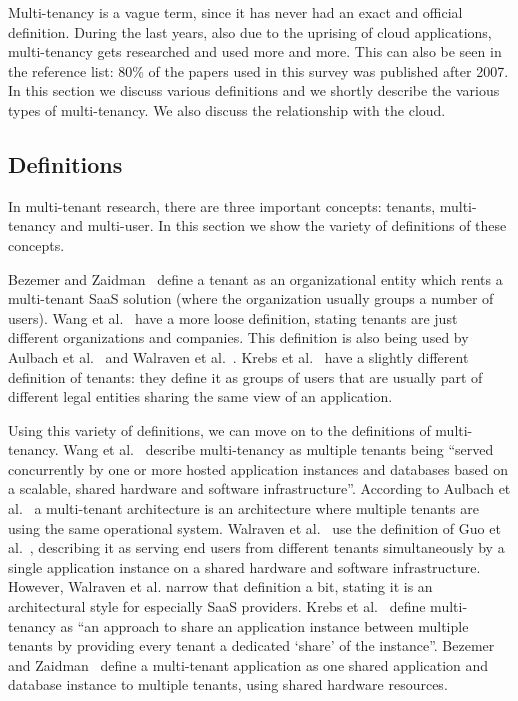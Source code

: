 Multi-tenancy is a vague term, since it has never had an exact and official definition. During the last years, also due to the uprising of cloud applications, multi-tenancy gets researched and used more and more. This can also be seen in the reference list: 80\% of the papers used in this survey was published after 2007. In this section we discuss various definitions and we shortly describe the various types of multi-tenancy. We also discuss the relationship with the cloud.

\subsection{Definitions}

In multi-tenant research, there are three important concepts: tenants, multi-tenancy and multi-user. In this section we show the variety of definitions of these concepts.

Bezemer and Zaidman~\cite{bezemer2010multi} define a tenant as an organizational entity which rents a multi-tenant \ac{SaaS} solution (where the organization usually groups a number of users). Wang et al.~\cite{wang2008study} have a more loose definition, stating tenants are just different organizations and companies. This definition is also being used by Aulbach et al.~\cite{aulbach2008multi} and Walraven et al.~\cite{walraven2012towards}. Krebs et al.~\cite{krebs2012architecture} have a slightly different definition of tenants: they define it as groups of users that are usually part of different legal entities sharing the same view of an application.

Using this variety of definitions, we can move on to the definitions of multi-tenancy. Wang et al.~\cite{wang2008study} describe multi-tenancy as multiple tenants being ``served concurrently by one or more hosted application instances and databases based on a scalable, shared hardware and software infrastructure''. According to Aulbach et al.~\cite{aulbach2008multi} a multi-tenant architecture is an architecture where multiple tenants are using the same operational system. Walraven et al.~\cite{walraven2012towards} use the definition of Guo et al.~\cite{guo2007framework}, describing it as serving end users from different tenants simultaneously by a single application instance on a shared hardware and software infrastructure. However, Walraven et al. narrow that definition a bit, stating it is an architectural style for especially \ac{SaaS} providers. Krebs et al.~\cite{krebs2012architecture} define multi-tenancy as ``an approach to share an application instance between multiple tenants by providing every tenant a dedicated `share' of the instance''. Bezemer and Zaidman~\cite{bezemer2010multi} define a multi-tenant application as one shared application and database instance to multiple tenants, using shared hardware resources.

